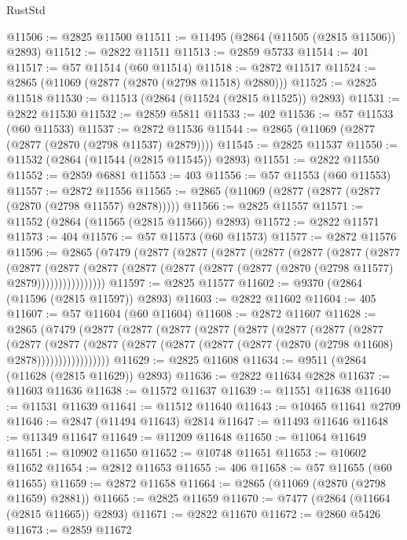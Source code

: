 \begin{lexlean}{RustStd}
\begin{coremodule}
@11506 := @2825 @11500
@11511 := @11495 (@2864 (@11505 (@2815 @11506)) @2893)
@11512 := @2822 @11511
@11513 := @2859 @5733
@11514 := 401
@11517 := @57 @11514 (@60 @11514)
@11518 := @2872 @11517
@11524 := @2865 (@11069 (@2877 (@2870 (@2798 @11518) @2880)))
@11525 := @2825 @11518
@11530 := @11513 (@2864 (@11524 (@2815 @11525)) @2893)
@11531 := @2822 @11530
@11532 := @2859 @5811
@11533 := 402
@11536 := @57 @11533 (@60 @11533)
@11537 := @2872 @11536
@11544 := @2865 (@11069 (@2877 (@2877 (@2870 (@2798 @11537) @2879))))
@11545 := @2825 @11537
@11550 := @11532 (@2864 (@11544 (@2815 @11545)) @2893)
@11551 := @2822 @11550
@11552 := @2859 @6881
@11553 := 403
@11556 := @57 @11553 (@60 @11553)
@11557 := @2872 @11556
@11565 := @2865 (@11069 (@2877 (@2877 (@2877 (@2870 (@2798 @11557) @2878)))))
@11566 := @2825 @11557
@11571 := @11552 (@2864 (@11565 (@2815 @11566)) @2893)
@11572 := @2822 @11571
@11573 := 404
@11576 := @57 @11573 (@60 @11573)
@11577 := @2872 @11576
@11596 := @2865
    (@7479
      (@2877
        (@2877
          (@2877
            (@2877
              (@2877
                (@2877
                  (@2877
                    (@2877
                      (@2877
                        (@2877
                          (@2877 (@2877 (@2877 (@2877 (@2870 (@2798 @11577) @2879))))))))))))))))
@11597 := @2825 @11577
@11602 := @9370 (@2864 (@11596 (@2815 @11597)) @2893)
@11603 := @2822 @11602
@11604 := 405
@11607 := @57 @11604 (@60 @11604)
@11608 := @2872 @11607
@11628 := @2865
    (@7479
      (@2877
        (@2877
          (@2877
            (@2877
              (@2877
                (@2877
                  (@2877
                    (@2877
                      (@2877
                        (@2877
                          (@2877
                            (@2877 (@2877 (@2877 (@2877 (@2870 (@2798 @11608) @2878)))))))))))))))))
@11629 := @2825 @11608
@11634 := @9511 (@2864 (@11628 (@2815 @11629)) @2893)
@11636 := @2822 @11634 @2828
@11637 := @11603 @11636
@11638 := @11572 @11637
@11639 := @11551 @11638
@11640 := @11531 @11639
@11641 := @11512 @11640
@11643 := @10465 @11641 @2709
@11646 := @2847 (@11494 @11643) @2814
@11647 := @11493 @11646
@11648 := @11349 @11647
@11649 := @11209 @11648
@11650 := @11064 @11649
@11651 := @10902 @11650
@11652 := @10748 @11651
@11653 := @10602 @11652
@11654 := @2812 @11653
@11655 := 406
@11658 := @57 @11655 (@60 @11655)
@11659 := @2872 @11658
@11664 := @2865 (@11069 (@2870 (@2798 @11659) @2881))
@11665 := @2825 @11659
@11670 := @7477 (@2864 (@11664 (@2815 @11665)) @2893)
@11671 := @2822 @11670
@11672 := @2860 @5426
@11673 := @2859 @11672

\end{coremodule}
\end{lexlean}
